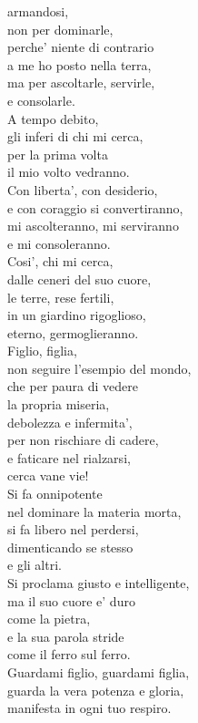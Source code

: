\begin{haiku}
{armandosi,\\
non per dominarle, \\
perche' niente di contrario\\
a me ho posto nella terra,\\
ma per ascoltarle, servirle,\\
e consolarle.\\
A tempo debito,\\
gli inferi di chi mi cerca,\\
per la prima volta \\
il mio volto vedranno.\\
Con liberta', con desiderio,\\
e con coraggio si convertiranno,\\
mi ascolteranno, mi serviranno\\
e mi consoleranno.\\
Cosi', chi mi cerca,\\
dalle ceneri del suo cuore,\\
le terre, rese fertili,\\
in un giardino rigoglioso,\\
eterno, germoglieranno.\\
Figlio, figlia, \\
non seguire l'esempio del mondo,\\
che per paura di vedere \\
la propria miseria, \\
debolezza e infermita', \\
per non rischiare di cadere, \\
e faticare nel rialzarsi,\\
cerca vane vie!\\
Si fa onnipotente \\
nel dominare la materia morta,\\
si fa libero nel perdersi,\\
dimenticando se stesso\\
e gli altri.\\
Si proclama giusto e intelligente,\\
ma il suo cuore e' duro\\
come la pietra,\\
e la sua parola stride \\
come il ferro sul ferro.\\
Guardami figlio, guardami figlia, \\
guarda la vera potenza e gloria,\\
manifesta in ogni tuo respiro.\\
}
\end{haiku}
